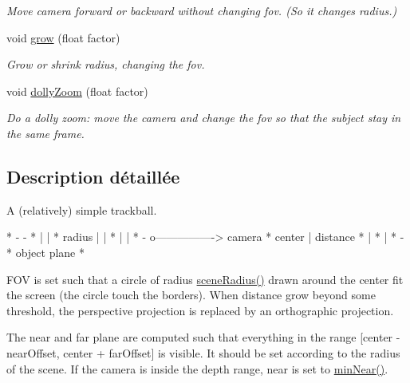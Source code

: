 \begin{DoxyCompactItemize}
\begin{DoxyCompactList}\small\item\em Move camera forward or backward without changing fov. (So it changes radius.) \end{DoxyCompactList}\item 
void \hyperlink{class_trackball_a4ac38af7646e5998ac341051d0458c58}{grow} (float factor)
\begin{DoxyCompactList}\small\item\em Grow or shrink radius, changing the fov. \end{DoxyCompactList}\item 
void \hyperlink{class_trackball_a12d2e0436352bb7d222e2a3aed39e41c}{dolly\+Zoom} (float factor)
\begin{DoxyCompactList}\small\item\em Do a dolly zoom\+: move the camera and change the fov so that the subject stay in the same frame. \end{DoxyCompactList}\end{DoxyCompactItemize}


\subsection{Description détaillée}
A (relatively) simple trackball. 

\begin{DoxyVerb}*        -  -
*        |  |
* radius |  |
*        |  |
*        -  o----------------> camera
*    center |    distance
*           |
*           |
*           -
 *     object plane
* \end{DoxyVerb}


F\+OV is set such that a circle of radius \hyperlink{class_trackball_acd26e3c6e72d935e556e6b10bd2a0c1d}{scene\+Radius()} drawn around the center fit the screen (the circle touch the borders). When distance grow beyond some threshold, the perspective projection is replaced by an orthographic projection.

The near and far plane are computed such that everything in the range \mbox{[}center -\/ near\+Offset, center + far\+Offset\mbox{]} is visible. It should be set according to the radius of the scene. If the camera is inside the depth range, near is set to \hyperlink{class_trackball_ae10b18ba9b38e588e996e35a709bab29}{min\+Near()}.

